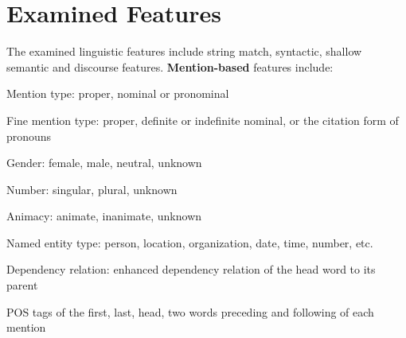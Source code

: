 \section{Examined Features}
\label{sect:base_features}
The examined linguistic features include string match, syntactic, shallow semantic and discourse features.
\textbf{Mention-based} features include:
\squishlist
\item Mention type: proper, nominal or pronominal
\item Fine mention type: proper, definite or indefinite nominal, or the citation form of pronouns
\item Gender: female, male, neutral, unknown
\item Number: singular, plural, unknown
\item Animacy: animate, inanimate, unknown
\item Named entity type: person, location, organization, date, time, number, etc.
\item Dependency relation: enhanced dependency relation \cite{SCHUSTER16.779} of the head word to its parent
\item POS tags of the first, last, head, two words preceding and following of each mention
\squishend


